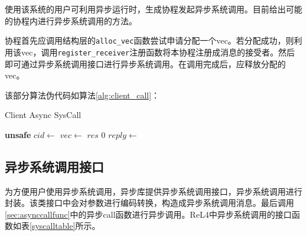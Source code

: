 使用该系统的用户可利用异步运行时，生成协程发起异步系统调用。目前给出可能的协程内进行异步系统调用的方法。

协程首先应调用结构层的\texttt{alloc\_vec}函数尝试申请分配一个vec。若分配成功，则利用该vec，调用\texttt{register\_receiver}注册函数将本协程注册成消息的接受者。然后即可通过异步系统调用接口进行异步系统调用。在调用完成后，应释放分配的vec。

该部分算法伪代码如算法\ref{alg:client_call}：

\begin{algorithm}
  \caption{Client Async SysCall}\label{alg:client_call}
  \begin{algorithmic}
    \State \textbf{unsafe}
    \State $cid \gets$ 
    \State $vec \gets$
    \State {}
    \State $res$
    \Else
    \State $0$
    \EndIf
    \State $reply \gets$  
    \State {}
    \Else
    \State {}
    \EndIf
    \EndFor
    \State {}
    \EndProcedure
  \end{algorithmic}
\end{algorithm}


\subsection{异步系统调用接口}

为方便用户使用异步系统调用，异步库提供异步系统调用接口，异步系统调用进行封装。该类接口中会对参数进行编码转换，构造成异步系统调用消息。最后调用\ref{sec:asynccallfunc}中的异步call函数进行异步调用。ReL4中异步系统调用的接口函数如表\ref{syscalltable}所示。

